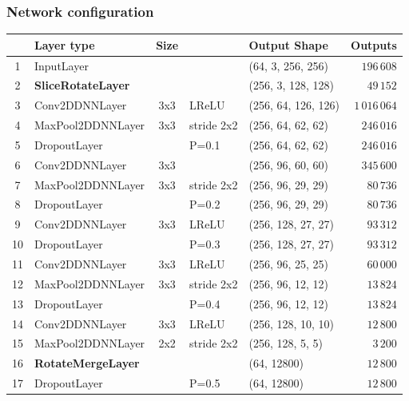 \begin{frame}\frametitle{Network configuration}
\centering
\begin{table}[]
\tiny
\centering
\begin{tabular}{@{}clcllr@{}}
\toprule
   & Layer type                & Size &             & Output Shape        & Outputs \\ \midrule
1  & InputLayer                &      &             & (64, 3, 256, 256)   & $196\,608$  \\
2  & \textbf{SliceRotateLayer} &      &             & (256, 3, 128, 128)  & $49\,152$   \\
3  & Conv2DDNNLayer            & 3x3  & LReLU       & (256, 64, 126, 126) & $1\,016\,064$ \\
4  & MaxPool2DDNNLayer         & 3x3  & stride 2x2  & (256, 64, 62, 62)   & $246\,016$  \\
5  & DropoutLayer              &      & P=0.1       & (256, 64, 62, 62)   & $246\,016$  \\
6  & Conv2DDNNLayer            & 3x3  &             & (256, 96, 60, 60)   & $345\,600$  \\
7  & MaxPool2DDNNLayer         & 3x3  & stride 2x2  & (256, 96, 29, 29)   & $80\,736$   \\
8  & DropoutLayer              &      & P=0.2       & (256, 96, 29, 29)   & $80\,736$   \\
9  & Conv2DDNNLayer            & 3x3  & LReLU       & (256, 128, 27, 27)  & $93\,312$   \\
10 & DropoutLayer              &      & P=0.3       & (256, 128, 27, 27)  & $93\,312$   \\
11 & Conv2DDNNLayer            & 3x3  & LReLU       & (256, 96, 25, 25)   & $60\,000$   \\
12 & MaxPool2DDNNLayer         & 3x3  & stride 2x2  & (256, 96, 12, 12)   & $13\,824$   \\
13 & DropoutLayer              &      & P=0.4       & (256, 96, 12, 12)   & $13\,824$   \\
14 & Conv2DDNNLayer            & 3x3  & LReLU       & (256, 128, 10, 10)  & $12\,800$   \\
15 & MaxPool2DDNNLayer         & 2x2  & stride 2x2  & (256, 128, 5, 5)    & $3\,200$    \\
16 & \textbf{RotateMergeLayer} &      &             & (64, 12800)         & $12\,800$   \\
17 & DropoutLayer              &      & P=0.5       & (64, 12800)         & $12\,800$   \\

\end{tabular}
\end{table}
\end{frame}
